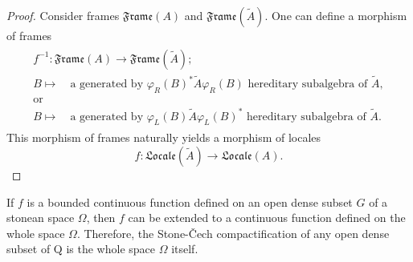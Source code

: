 \documentclass{beamer}
\theoremstyle{plain}
\newcommand{\bean}{\begin{eqnarray*}}
\newcommand{\eean}{\end{eqnarray*}}
\newcommand{\Om}{\Omega}
\begin{document}
\begin{frame}
\begin{proof}
	Consider frames $\mathfrak{Frame}\left(  A\right)$ and   $\mathfrak{Frame}\left( \widetilde A\right)$. One can define a morphism of frames
	\bean
	\begin{split}
		f^{-1}:\mathfrak{Frame}\left(  A\right)\to \mathfrak{Frame}\left( \widetilde A\right);\\
		B \mapsto \quad \text{a generated by } \varphi_R\left(B \right)^*\widetilde{A} \varphi_R\left(B \right) \text{ hereditary subalgebra of } \widetilde A,\\
		\text{or}\\ B \mapsto \quad \text{a generated by } \varphi_L\left(B \right)\widetilde{A} \varphi_L\left(B \right)^* \text{ hereditary subalgebra of } \widetilde A.
	\end{split}
	\eean
This morphism  of frames naturally yields  a morphism of locales
	$$
	f: \mathfrak{Locale}\left( \widetilde A\right)\to\mathfrak{Locale}\left( A\right).
	$$
	
\end{proof}
\end{frame}


\begin{frame}
\begin{lemma}
If $f$ is a bounded continuous function defined on an open dense 
subset $G$ of a stonean space $\Om$, then $f$ can be extended to a continuous function 
defined on the whole space $\Om$. Therefore, the Stone-\v{C}ech compactification 
of any open dense subset of Q is the whole space $\Om$ itself. 
\end{lemma}


\end{frame}
\end{document}
